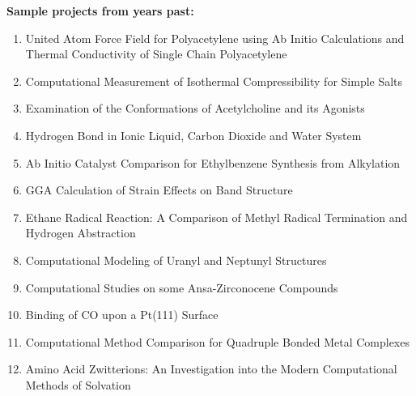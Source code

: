 \documentclass[11pt]{article}
\begin{document}
\newpage

\noindent \textbf{Sample projects from years past:}

\begin{enumerate}
\item United Atom Force Field for Polyacetylene using Ab Initio Calculations and Thermal Conductivity of Single Chain Polyacetylene

\item Computational Measurement of Isothermal Compressibility for Simple Salts

\item Examination of the Conformations of Acetylcholine and its Agonists

\item Hydrogen Bond in Ionic Liquid, Carbon Dioxide and Water System

\item Ab Initio Catalyst Comparison for Ethylbenzene Synthesis from Alkylation

\item GGA Calculation of Strain Effects on  Band Structure

\item Ethane Radical Reaction: A Comparison of Methyl Radical Termination and Hydrogen Abstraction

\item Computational Modeling of Uranyl and Neptunyl Structures

\item Computational Studies on some Ansa-Zirconocene Compounds

\item Binding of CO upon a Pt(111) Surface

\item Computational Method Comparison for Quadruple Bonded Metal Complexes

\item Amino Acid Zwitterions: An Investigation into the Modern Computational Methods of Solvation
\end{enumerate}
\end{document}
